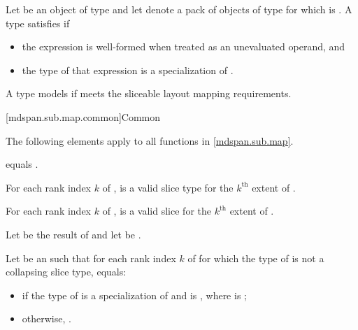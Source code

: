 \begin{itemdescr}
\pnum
Let  be an object of type 
and let  denote a pack of objects of type 
for which  is .
A type  satisfies  if
\begin{itemize}
\item
  the expression  is well-formed
  when treated as an unevaluated operand, and
\item
  the type of that expression is a specialization of
  .
\end{itemize}

\pnum
A type  models 
if  meets the sliceable layout mapping requirements.
\end{itemdescr}

[mdspan.sub.map.common]{Common}

\pnum
The following elements apply to all functions in \ref{mdspan.sub.map}.

\pnum
\constraints
{} equals .

\pnum
\mandates
For each rank index $k$ of ,
 is a valid  slice type
for the $k^\text{th}$ extent of .

\pnum
\expects
For each rank index $k$ of ,
 is a valid slice
for the $k^\text{th}$ extent of .

\pnum
Let  be
the result of  and
let  be .

\pnum
Let  be
an 
such that for each rank index $k$ of 
for which the type of  is not a collapsing slice type,
 equals:
\begin{itemize}
\item
{}
if the type of  is a specialization of  and
 is ,
where  is ;
\item
otherwise, .
\end{itemize}

